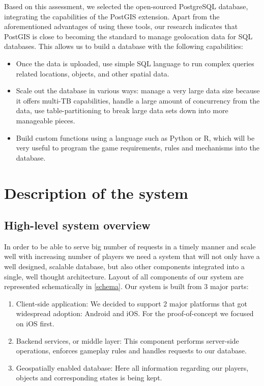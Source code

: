 \documentclass[conference]{IEEEtran}
\begin{document}
Based on this assessment, we selected the open-sourced PostgreSQL database, integrating the capabilities of the PostGIS extension. Apart from the aforementioned advantages of using these tools, our research indicates that PostGIS is close to becoming the standard to manage geolocation data for SQL databases.  This allows us to build a database with the following capabilities:

\begin{itemize}
\item	Once the data is uploaded, use simple SQL language to run complex queries related locations, objects, and other spatial data. 
\item Scale out the database in various ways: manage a very large data size because it offers multi-TB capabilities, handle a large amount of concurrency from the data, use table-partitioning to break large data sets down into more manageable pieces.
\item Build custom functions using a language such as Python or R, which will be very useful to program the game requirements, rules and mechanisms into the database. 
\end{itemize}

\section{Description of the system}

\subsection{High-level system overview}
In order to be able to serve big number of requests in a timely manner and scale well with increasing number of players we need a system that will not only have a well designed, scalable database, but also other components integrated into a single, well thought architecture. Layout of all components of our system are represented schematically in \autoref{schema}.  Our system is built from 3 major parts:

\begin{enumerate}
  \item Client-side application: We decided to support 2 major platforms that got widespread adoption: Android and iOS. For the proof-of-concept we focused on iOS first. 
  \item Backend services, or middle layer: This component performs server-side operations, enforces gameplay rules and handles requests to our database. 
  \item Geospatially enabled database: Here all information regarding our players, objects and corresponding states is being kept. 
\end{enumerate}
\end{document}
